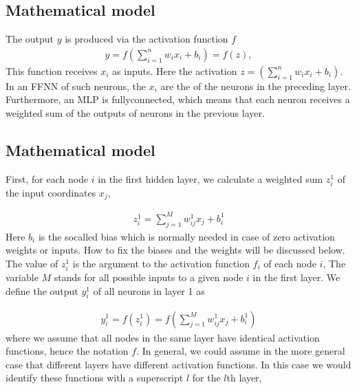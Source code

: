 \documentclass[letterpaper,10pt,english]{sphinxmanual}
\begin{document}
\subsection{Mathematical model}
\label{\detokenize{chapter6:mathematical-model}}
The output \(y\) is produced via the activation function \(f\)
\begin{equation*}
\begin{split}
y = f\left(\sum_{i=1}^n w_ix_i + b_i\right) = f(z),
\end{split}
\end{equation*}
This function receives \(x_i\) as inputs.
Here the activation \(z=(\sum_{i=1}^n w_ix_i+b_i)\).
In an FFNN of such neurons, the  \(x_i\) are the  of
the neurons in the preceding layer. Furthermore, an MLP is
fully\sphinxhyphen{}connected, which means that each neuron receives a weighted sum
of the outputs of  neurons in the previous layer.


\subsection{Mathematical model}
\label{\detokenize{chapter6:id1}}
First, for each node \(i\) in the first hidden layer, we calculate a weighted sum \(z_i^1\) of the input coordinates \(x_j\),




\begin{equation*}
\begin{split}
\begin{equation} z_i^1 = \sum_{j=1}^{M} w_{ij}^1 x_j + b_i^1
\label{_auto1} \tag{2}
\end{equation}
\end{split}
\end{equation*}
Here \(b_i\) is the so\sphinxhyphen{}called bias which is normally needed in
case of zero activation weights or inputs. How to fix the biases and
the weights will be discussed below.  The value of \(z_i^1\) is the
argument to the activation function \(f_i\) of each node \(i\), The
variable \(M\) stands for all possible inputs to a given node \(i\) in the
first layer.  We define  the output \(y_i^1\) of all neurons in layer 1 as




\begin{equation*}
\begin{split}
\begin{equation}
 y_i^1 = f(z_i^1) = f\left(\sum_{j=1}^M w_{ij}^1 x_j  + b_i^1\right)
\label{outputLayer1} \tag{3}
\end{equation}
\end{split}
\end{equation*}
where we assume that all nodes in the same layer have identical
activation functions, hence the notation \(f\). In general, we could assume in the more general case that different layers have different activation functions.
In this case we would identify these functions with a superscript \(l\) for the \(l\)\sphinxhyphen{}th layer,
\end{document}
